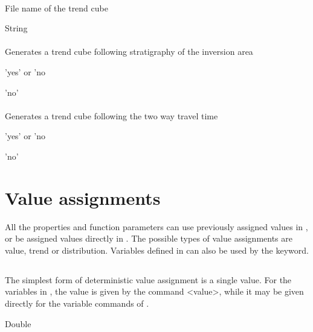 {\paragraph{}
 \slist
   \item \Description File name of the trend cube 
   \item \Argument String
   \item \Default 
 \elist

\paragraph{}
 \slist
   \item \Description Generates a trend cube following stratigraphy of the inversion area
   \item \Argument 'yes' or 'no
   \item \Default 'no'
 \elist

\paragraph{}
 \slist
   \item \Description Generates a trend cube following the two way travel time
   \item \Argument 'yes' or 'no
   \item \Default 'no'
 \elist

\section{Value assignments}
\label{sec:valueassignment}
All the properties and function parameters can use previously assigned values in , or be assigned values directly in . The possible types of value assignments are value, trend or distribution. Variables defined in  can also be used by the  keyword.

\subsection{}
 \slist
   \item \Description The simplest form of deterministic value assignment is a single value. For the variables in , the value is given by the command <value>, while it may be given directly for the variable commands of . 
   \item \Argument Double
   \item \Default 
 \elist

}
